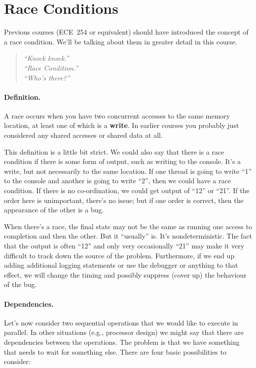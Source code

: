 \documentclass[a4paper]{report}
\begin{document}
\section*{Race Conditions}
Previous courses (ECE~254 or equivalent) should have introduced the concept of a race condition. We'll be talking about them in greater detail in this course.

\begin{quote}
\textit{
	``Knock knock.''\\
	``Race Condition.''\\
	``Who's there?''
	}
\end{quote}

\paragraph{Definition.} A race occurs when you have two concurrent accesses to the
same memory location, at least one of which is a {\bf write}. In earlier courses you probably just considered any shared accesses or shared data at all. 

This definition is a little bit strict. We could also say that there is a race condition if there is some form of output, such as writing to the console. It's a write, but not necessarily to the same location. If one thread is going to write ``1'' to the console and another is going to write ``2'', then we could have a race condition. If there is no co-ordination, we could get output of ``12'' or ``21''. If the order here is unimportant, there's no issue; but if one order is correct, then the appearance of the other is a bug.

When there's a race, the final state may not be the same as running
one access to completion and then the other. But it ``usually'' is. It's nondeterministic. The fact that the output is often ``12'' and only very occasionally ``21'' may make it very difficult to track down the source of the problem. Furthermore, if we end up adding additional logging statements or use the debugger or anything to that effect, we will change the timing and possibly suppress (cover up) the behaviour of the bug.

\paragraph{Dependencies.}
Let's now consider two sequential operations that we would like to execute in parallel.
In other situations (e.g., processor design) we might say that there are dependencies between the operations. The problem is that we have something that needs to wait for something else. There are four basic possibilities to consider:
\end{document}
